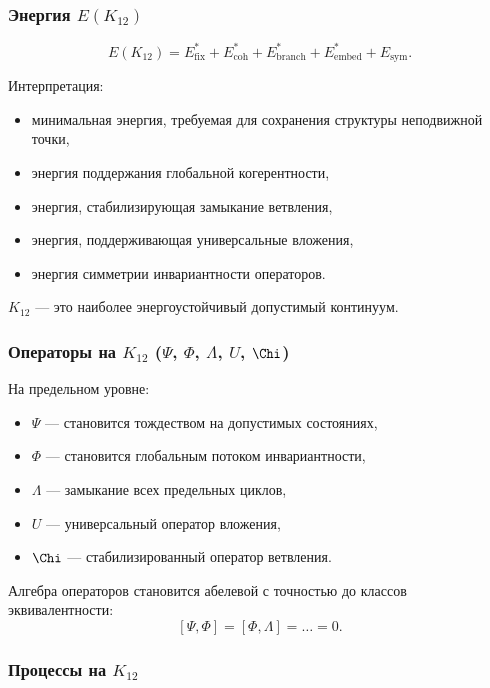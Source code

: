 \subsubsection{Энергия $E(K_{12})$}

\[
E(K_{12}) =
E_{\mathrm{fix}}^*
+E_{\mathrm{coh}}^*
+E_{\mathrm{branch}}^*
+E_{\mathrm{embed}}^*
+E_{\mathrm{sym}}.
\]

Интерпретация:
\begin{itemize}
    \item минимальная энергия, требуемая для сохранения структуры неподвижной
          точки,
    \item энергия поддержания глобальной когерентности,
    \item энергия, стабилизирующая замыкание ветвления,
    \item энергия, поддерживающая универсальные вложения,
    \item энергия симметрии инвариантности операторов.
\end{itemize}

$K_{12}$ — это наиболее энергоустойчивый допустимый континуум.

\subsubsection{Операторы на $K_{12}$ ($\Psi$, $\Phi$, $\Lambda$, $U$, $\Chi$)}

На предельном уровне:

\begin{itemize}
    \item $\Psi$ — становится тождеством на допустимых состояниях,
    \item $\Phi$ — становится глобальным потоком инвариантности,
    \item $\Lambda$ — замыкание всех предельных циклов,
    \item $U$ — универсальный оператор вложения,
    \item $\Chi$ — стабилизированный оператор ветвления.
\end{itemize}

Алгебра операторов становится абелевой с точностью до классов эквивалентности:
\[
[\Psi,\Phi]=[\Phi,\Lambda]=\dots = 0.
\]

\subsubsection{Процессы на $K_{12}$}

